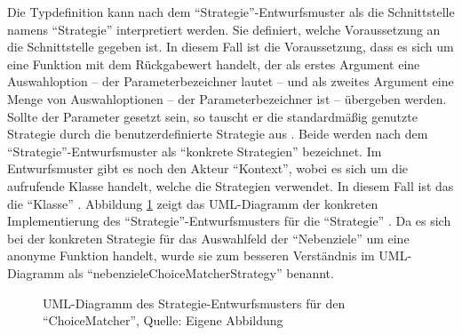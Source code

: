 Die Typdefinition   kann nach dem \enquote{Strategie}-Entwurfsmuster als die Schnittstelle namens \enquote{Strategie} interpretiert werden.
Sie definiert, welche Voraussetzung an die Schnittstelle gegeben ist.
In diesem Fall ist die Voraussetzung, dass es sich um eine Funktion mit dem Rückgabewert  handelt,
der als erstes Argument eine Auswahloption
-- der Parameterbezeichner lautet  --
und als zweites Argument eine Menge von Auswahloptionen
-- der Parameterbezeichner ist  --
übergeben werden.
Sollte der Parameter  gesetzt sein,
so tauscht er die standardmäßig genutzte Strategie  durch die benutzerdefinierte Strategie aus .
Beide werden nach dem \enquote{Strategie}-Entwurfsmuster als \enquote{konkrete Strategien} bezeichnet.
Im Entwurfsmuster gibt es noch den Akteur \enquote{Kontext},
wobei es sich um die aufrufende Klasse handelt,
welche die Strategien verwendet.
In diesem Fall ist das die \enquote{Klasse} .
Abbildung \ref{fig:UmlChoiceMatcherStrategyPattern} zeigt das UML-Diagramm der konkreten Implementierung des \enquote{Strategie}-Entwurfsmusters für die \enquote{Strategie} .
Da es sich bei der konkreten Strategie für das Auswahlfeld der \enquote{Nebenziele} um eine anonyme Funktion handelt,
wurde sie zum besseren Verständnis im UML-Diagramm als \enquote{nebenzieleChoiceMatcherStrategy} benannt.
\ifIncludeFigures
  \begin{figure}[h]
    \centering


    \caption[UML-Diagramm des Strategie-Entwurfsmusters für den \enquote{ChoiceMatcher}]{UML-Diagramm des Strategie-Entwurfsmusters für den \enquote{ChoiceMatcher}, Quelle: Eigene Abbildung}
    \label{fig:UmlChoiceMatcherStrategyPattern}

  \end{figure}%
\fi

